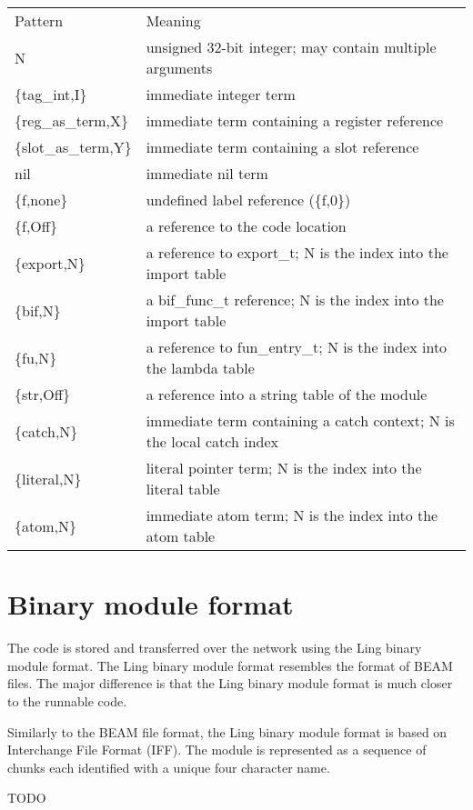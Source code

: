 \documentclass{article}
\begin{document}
\begin{table}[!ht]
\begin{tabular}{ll}
Pattern & Meaning \\
N & unsigned 32-bit integer; may contain multiple arguments \\
\{tag\_int,I\} & immediate integer term \\
\{reg\_as\_term,X\} & immediate term containing a register reference \\
\{slot\_as\_term,Y\} & immediate term containing a slot reference \\
nil & immediate nil term \\
\{f,none\} & undefined label reference (\{f,0\}) \\
\{f,Off\} & a reference to the code location \\
\{export,N\} & a reference to export\_t; N is the index into the import
table \\
\{bif,N\} & a bif\_func\_t reference; N is the index into the import table \\
\{fu,N\} & a reference to fun\_entry\_t; N is the index into the lambda table \\
\{str,Off\} & a reference into a string table of the module \\
\{catch,N\} & immediate term containing a catch context; N is the local catch
index \\
\{literal,N\} & literal pointer term; N is the index into the literal table \\
\{atom,N\} & immediate atom term; N is the index into the atom table \\
\end{tabular}
\end{table}

\section*{Binary module format}

The code is stored and transferred over the network using the Ling binary module
format. The Ling binary module format resembles the format of BEAM files. The major
difference is that the Ling binary module format is much closer to the runnable
code.

Similarly to the BEAM file format, the Ling binary module format is based on
Interchange File Format (IFF). The module is represented as a sequence of chunks
each identified with a unique four character name.

TODO
\end{document}
